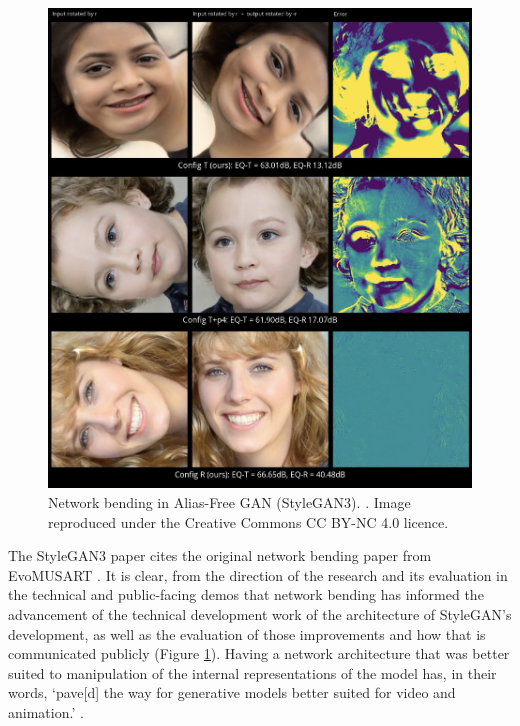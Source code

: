  \begin{figure}[!htb]
    \centering
    \captionsetup{justification=centering}
    \includegraphics[width=1\textwidth]{figures/c7_impact/net-bend-technical/style-gan-rotations.png}
    \caption[Network bending in Alias-Free GAN (StyleGAN3)]{Network bending in Alias-Free GAN (StyleGAN3). \citep{karras2021alias}. Image reproduced under the Creative Commons CC BY-NC 4.0 licence.}
    \label{fig:c7:alias-free-gan}
\end{figure}

 The StyleGAN3 paper cites the original network bending paper from EvoMUSART \citep{broad2021network}.
 It is clear, from the direction of the research and its evaluation in the technical and public-facing demos that network bending has informed the advancement of the technical development work of the architecture of StyleGAN's development, as well as the evaluation of those improvements and how that is communicated publicly (Figure \ref{fig:c7:alias-free-gan}). 
 Having a network architecture that was better suited to manipulation of the internal representations of the model has, in their words, `pave[d] the way for generative models better suited for video and animation.' \citep{karras2021alias}.

